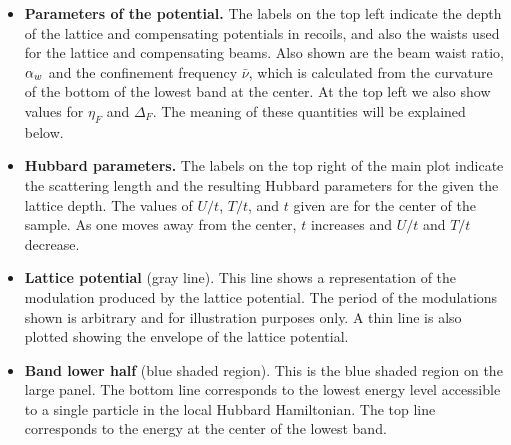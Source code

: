\begin{itemize} 

\item \textbf{Parameters of the potential.}  The labels on the top left indicate
the depth of the lattice and compensating potentials in recoils, and also the
waists used for the lattice and compensating beams.   Also
shown are the beam waist ratio, $ \alpha_{w} $ and the confinement frequency
$\bar{\nu}$, which is calculated from the curvature of the bottom of the lowest
band at the center.  At the top left we also show values for $\eta_{F}$ and
$\Delta_{F}$.  The meaning of these quantities will be explained below. 

\item \textbf{Hubbard parameters.}  The labels on the top right of the main
plot indicate the scattering length and the resulting Hubbard parameters for
the given the lattice depth.  The values of $U/t$, $T/t$, and $t$ given are
for the center of the sample.  As one moves away from the center, $t$
increases and  $U/t$ and $T/t$ decrease.
 
\item \textbf{Lattice potential} (gray line). This line shows a representation of the
modulation produced by the lattice potential.   The period of the modulations
shown is arbitrary and for illustration purposes only.  A thin line is also
plotted showing the envelope of the lattice potential.  



\item \textbf{Band lower half} (blue shaded region).  This is the blue shaded
region on the large panel. The bottom line corresponds to the lowest energy
level accessible to a single particle in the local  Hubbard Hamiltonian.   The
top line corresponds to the energy at the center of the lowest band.   


\end{itemize}
